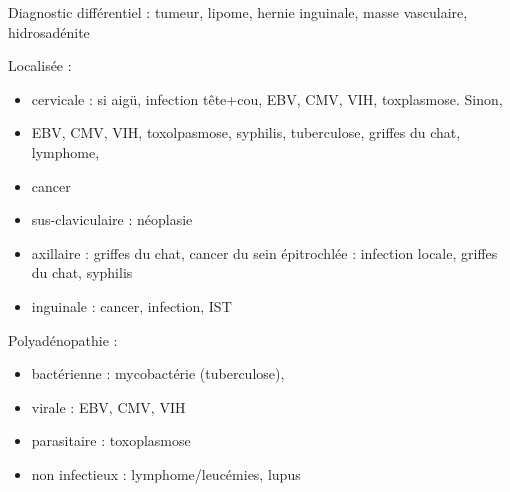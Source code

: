 {Diagnostic différentiel : tumeur, lipome, hernie inguinale, masse vasculaire,
hidrosadénite

Localisée :
\begin{itemize}
\item cervicale : si aigü, infection tête+cou, EBV, CMV, VIH, toxplasmose. Sinon,
\item EBV, CMV, VIH, toxolpasmose, syphilis, tuberculose, griffes du chat, lymphome,
\item cancer
\item sus-claviculaire : néoplasie
\item axillaire : griffes du chat, cancer du sein
 épitrochlée : infection locale, griffes du chat, syphilis
\item inguinale : cancer, infection, IST
\end{itemize}

Polyadénopathie :
\begin{itemize}
\item  bactérienne : mycobactérie (tuberculose),
\item  virale : EBV, CMV, VIH
\item  parasitaire : toxoplasmose
\item  non infectieux : lymphome/leucémies, lupus
\end{itemize}




}
